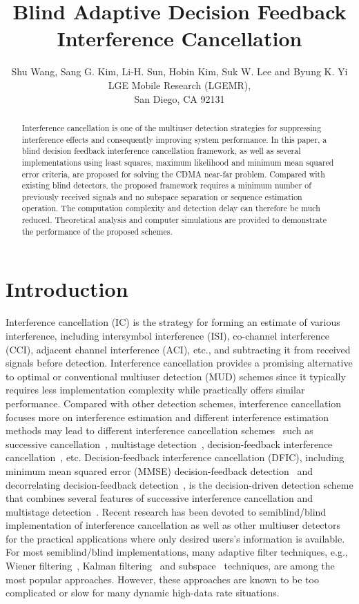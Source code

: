 \documentclass[a4paper,10pt,fleqn, twocolumn]{IEEETran}
\title{Blind Adaptive Decision Feedback Interference Cancellation}
\author{Shu Wang, Sang G. Kim, Li-H. Sun, Hobin Kim, Suk W. Lee and Byung K. Yi\\ LGE Mobile Research (LGEMR),\\ San Diego, CA 92131}
\date{}
\begin{document}
\maketitle
\begin{abstract}\small
Interference cancellation is one of the multiuser detection
strategies for suppressing interference effects and consequently
improving system performance. In this paper, a blind decision
feedback interference cancellation framework, as well as several
implementations using least squares, maximum likelihood and
minimum mean squared error criteria, are proposed for solving the
CDMA near-far problem. Compared with existing blind detectors, the
proposed framework requires a minimum number of previously
received signals and no subspace separation or sequence estimation
operation. The computation complexity and detection delay can
therefore be much reduced. Theoretical analysis and computer
simulations are provided to demonstrate the performance of the
proposed schemes.
\end{abstract}
\section{Introduction}
Interference cancellation (IC) is the strategy for forming an
estimate of various interference, including intersymbol
interference (ISI), co-channel interference (CCI), adjacent
channel interference (ACI), etc., and subtracting it from received
signals before detection. Interference cancellation provides a
promising alternative to optimal or conventional multiuser
detection (MUD) schemes since it typically requires less
implementation complexity while practically offers similar
performance. Compared with other detection schemes, interference
cancellation focuses more on interference estimation and different
interference estimation methods may lead to different interference
cancellation schemes~\cite{Yoon93B,Verd98,Wang02b} such as
successive cancellation~\cite{Kohno91}, multistage
detection~\cite{Vara88}, decision-feedback interference
cancellation~\cite{Kave85,Duel93,Duel95}, etc. Decision-feedback
interference cancellation (DFIC), including minimum mean squared
error (MMSE) decision-feedback detection~\cite{Kave85} and
decorrelating decision-feedback detection~\cite{Duel93,Duel95}, is
the decision-driven detection scheme that combines several
features of successive interference cancellation and multistage
detection~\cite{Verd98}. Recent research has been devoted to
semiblind/blind implementation of interference cancellation as
well as other multiuser
detectors~\cite{Madh94,Madh98,Wang98,Zhang02} for the practical
applications where only desired users's information is available.
For most semiblind/blind implementations, many adaptive filter
techniques, e.g., Wiener filtering~\cite{Madh94}, Kalman
filtering~\cite{Zhang02} and subspace~\cite{Wang98} techniques,
are among the most popular approaches. However, these approaches
are known to be too complicated or slow for many dynamic high-data
rate situations.
\end{document}
